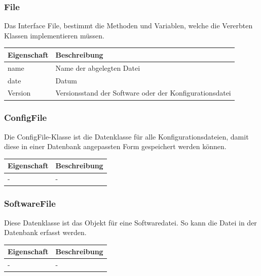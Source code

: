 \subsubsection{File}
Das Interface File, bestimmt die Methoden und Variablen, welche die Vererbten Klassen implementieren müssen.
\begin{table}[H]
\centering
    \begin{tabular}{@{}l p{14.1cm} @{}}\toprule    
    {Eigenschaft} & {Beschreibung}\\ \midrule      
    name & Name der abgelegten Datei\\
    date & Datum\\ 
    Version & Versionsstand der Software oder der Konfigurationsdatei\\
    \bottomrule
    \end{tabular}
\end{table}


\subsubsection{ConfigFile}
Die ConfigFile-Klasse ist die Datenklasse für alle Konfigurationsdateien, damit diese in einer Datenbank angepassten Form gespeichert werden können. \begin{table}[H]
\centering
    \begin{tabular}{@{}l p{14.1cm} @{}}\toprule    
    {Eigenschaft} & {Beschreibung}\\ \midrule      
    - & -\\
    \bottomrule
    \end{tabular}
\end{table}



\subsubsection{SoftwareFile}
Diese Datenklasse ist das Objekt für eine Softwaredatei. So kann die Datei in der Datenbank erfasst werden.
\begin{table}[H]
\centering
    \begin{tabular}{@{}l p{14.1cm} @{}}\toprule    
    {Eigenschaft} & {Beschreibung}\\ \midrule      
    - & -\\
    \bottomrule
    \end{tabular}
\end{table}



